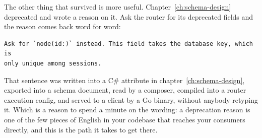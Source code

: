 %
The other thing that survived is more useful.
Chapter~\ref{ch:schema-design} deprecated  and wrote a reason
on it. Ask the router for its deprecated fields and the reason comes back word
for word:

\begin{verbatim}
Ask for `node(id:)` instead. This field takes the database key, which is
only unique among sessions.
\end{verbatim}

%
That sentence was written into a C\# attribute in chapter~\ref{ch:schema-design},
exported into a schema document, read by a composer, compiled into a router
execution config, and served to a client by a Go binary, without anybody
retyping it. Which is a reason to spend a minute on the wording: a deprecation
reason is one of the few pieces of English in your codebase that reaches your
consumers directly, and this is the path it takes to get there.
%
